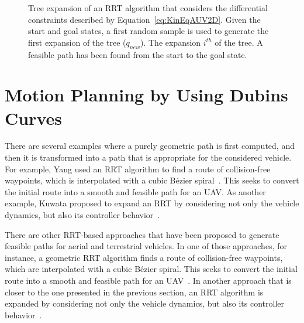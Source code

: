 \begin{figure}[htbp]
    \myfloatalign
     \quad
     \quad
\caption[Start-to-goal query solution by expanding an RRT algorithm that
considers the differential constraints of a car-like system.]
{Tree expansion of an \ac{RRT} algorithm that considers the differential
constraints described by Equation~\eqref{eq:KinEqAUV2D}.
\protect {} Given the start and goal states, a
first random sample is used to generate the first expansion of the tree
($q_{new}$).
\protect {} The expansion $i^{th}$ of the tree.
\protect {} A feasible path has been found from
the start to the goal state.}
\label{fig:RRTDiffConstr}
\end{figure}


\section{Motion Planning by Using Dubins Curves}
\label{sec:expan_2d_dubins}

There are several examples where a purely geometric path is first computed, and
then it is transformed into a path that is appropriate for the considered
vehicle. For example, Yang \etal used an \ac{RRT} algorithm to find a route of
collision-free waypoints, which is interpolated with a cubic B\'ezier
spiral~\cite{Yang2008}. This seeks to convert the initial route into a smooth
and feasible path for an \ac{UAV}. As another example, Kuwata \etal proposed to
expand an \ac{RRT} by considering not only the vehicle dynamics, but also its
controller behavior~\cite{Kuwata2009}.

There are other \ac{RRT}-based approaches that have been proposed to generate
feasible paths for aerial and terrestrial vehicles. In one of those approaches,
for instance, a geometric \ac{RRT} algorithm finds a route of collision-free
waypoints, which are interpolated with a cubic B\'ezier spiral. This seeks to
convert the initial route into a smooth and feasible path for an
\ac{UAV}~\cite{Yang2008}. In another approach that is closer to the one
presented in the previous section, an \ac{RRT} algorithm is expanded by
considering not only the vehicle dynamics, but also its controller
behavior~\cite{Kuwata2009}.

